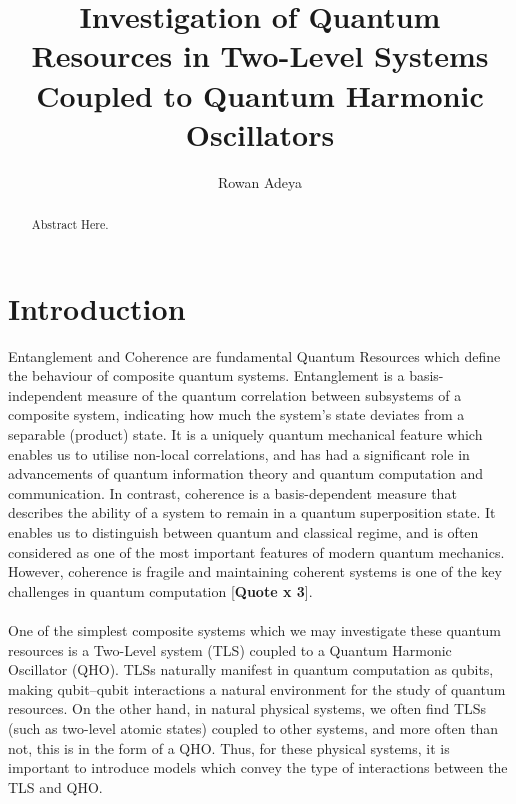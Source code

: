 \documentclass[12pt]{article}
\title{\textbf{Investigation of Quantum Resources in Two-Level Systems Coupled to Quantum Harmonic Oscillators}}
\author{Rowan Adeya}
\date{}
\begin{document}
\maketitle

\newpage

\vspace{\fill}
\begin{abstract}
    Abstract Here.
\end{abstract}
\vspace{\fill}

\newpage

\tableofcontents

\newpage
\section{Introduction}

Entanglement and Coherence are fundamental Quantum Resources which define the behaviour of composite quantum systems. Entanglement is a basis-independent measure of the quantum correlation between subsystems of a
composite system, indicating how much the system’s state deviates from a separable (product) state. It is a uniquely quantum mechanical feature which enables us to utilise non-local correlations, and has had a significant role in advancements of quantum information theory and quantum computation and communication. In contrast, coherence is a basis-dependent measure that describes the ability of a system to remain in a quantum superposition state. It enables us to distinguish between quantum and classical regime, and is often considered as one of the most important features of modern quantum mechanics. However, coherence is fragile and maintaining coherent systems is one of the key challenges in quantum computation [\textbf{Quote x 3}]. \\
\\
One of the simplest composite systems which we may investigate these quantum resources is a Two-Level system (TLS) coupled to a Quantum Harmonic Oscillator (QHO). TLSs naturally manifest in quantum computation as qubits, making qubit–qubit interactions a natural environment for the study of quantum resources. On the other hand, in natural physical systems, we often find TLSs (such as two-level atomic states) coupled to other systems, and more often than not, this is in the form of a QHO. Thus, for these physical systems, it is important to introduce models which convey the type of interactions between the TLS and QHO. 
\end{document}
